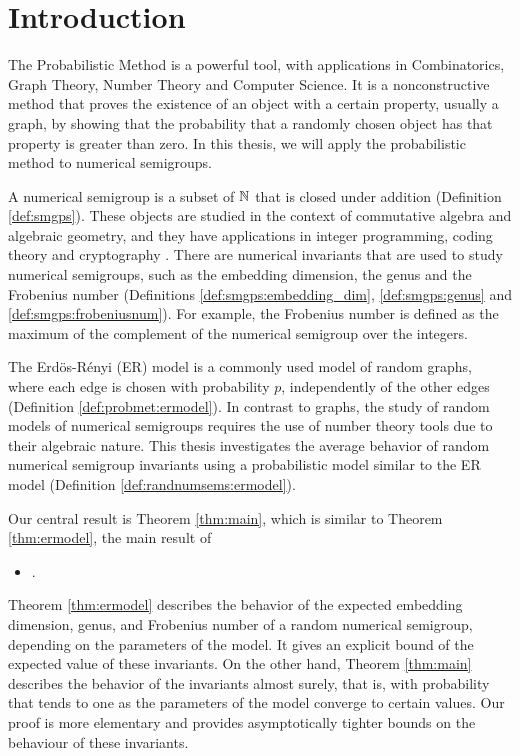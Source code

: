 \chapter{Introduction}\label{chap:intro}


The Probabilistic Method is a powerful tool, with applications in Combinatorics, Graph Theory, Number Theory and Computer Science. It is a nonconstructive method that proves the existence of an object with a certain property, usually a graph, by showing that the probability that a randomly chosen object has that property is greater than zero. In this thesis, we will apply the probabilistic method to numerical semigroups. \par

A numerical semigroup is a subset of $\mathbb{N}$ that is closed under addition (Definition \ref{def:smgps}). These objects are studied in the context of commutative algebra and algebraic geometry, and they have applications in integer programming, coding theory and cryptography \cite{assi2020numerical}. There are numerical invariants that are used to study numerical semigroups, such as the embedding dimension, the genus and the Frobenius number (Definitions \ref{def:smgps:embedding_dim}, \ref{def:smgps:genus} and \ref{def:smgps:frobeniusnum}). For example, the Frobenius number is defined as the maximum of the complement of the numerical semigroup over the integers. \par

The Erdös-Rényi (ER) model is a commonly used model of random graphs, where each edge is chosen with probability $p$, independently of the other edges (Definition \ref{def:probmet:ermodel}). In contrast to graphs, the study of random models of numerical semigroups requires the use of number theory tools due to their algebraic nature. This thesis investigates the average behavior of random numerical semigroup invariants using a probabilistic model similar to the ER model (Definition \ref{def:randnumsems:ermodel}).


Our central result is Theorem \ref{thm:main}, which is similar to Theorem \ref{thm:ermodel}, the main result of 
\begin{itemize}
    \item {}.
\end{itemize}
Theorem \ref{thm:ermodel} describes the behavior of the expected embedding dimension, genus, and Frobenius number of a random numerical semigroup, depending on the parameters of the model. It gives an explicit bound of the expected value of these invariants. On the other hand, Theorem \ref{thm:main} describes the behavior of the invariants almost surely, that is, with probability that tends to one as the parameters of the model converge to certain values. Our proof is more elementary and provides asymptotically tighter bounds on the behaviour of these invariants. 


